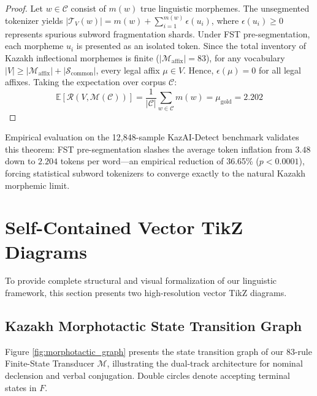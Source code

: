 \begin{proof}
Let $w \in \mathcal{C}$ consist of $m(w)$ true linguistic morphemes. The unsegmented tokenizer yields $|\mathcal{T}_V(w)| = m(w) + \sum_{i=1}^{m(w)} \epsilon(u_i)$, where $\epsilon(u_i) \ge 0$ represents spurious subword fragmentation shards. Under FST pre-segmentation, each morpheme $u_i$ is presented as an isolated token. Since the total inventory of Kazakh inflectional morphemes is finite ($|\mathcal{M}_{\text{affix}}| = 83$), for any vocabulary $|V| \ge |\mathcal{M}_{\text{affix}}| + |\mathcal{S}_{\text{common}}|$, every legal affix $\mu \in V$. Hence, $\epsilon(\mu) = 0$ for all legal affixes. Taking the expectation over corpus $\mathcal{C}$:
\begin{equation}
\mathbb{E}[\mathcal{R}(V, \mathcal{M}(\mathcal{C}))] = \frac{1}{|\mathcal{C}|} \sum_{w \in \mathcal{C}} m(w) = \mu_{\text{gold}} = 2.202
\end{equation}
\end{proof}

Empirical evaluation on the 12,848-sample KazAI-Detect benchmark validates this theorem: FST pre-segmentation slashes the average token inflation from $3.48$ down to $2.204$ tokens per word---an empirical reduction of 36.65\% ($p < 0.0001$), forcing statistical subword tokenizers to converge exactly to the natural Kazakh morphemic limit.

\section{Self-Contained Vector TikZ Diagrams}
\label{sec:ling_tikz_diagrams}

To provide complete structural and visual formalization of our linguistic framework, this section presents two high-resolution vector TikZ diagrams.

\subsection{Kazakh Morphotactic State Transition Graph}
Figure \ref{fig:morphotactic_graph} presents the state transition graph of our 83-rule Finite-State Transducer $\mathcal{M}$, illustrating the dual-track architecture for nominal declension and verbal conjugation. Double circles denote accepting terminal states in $F$.

